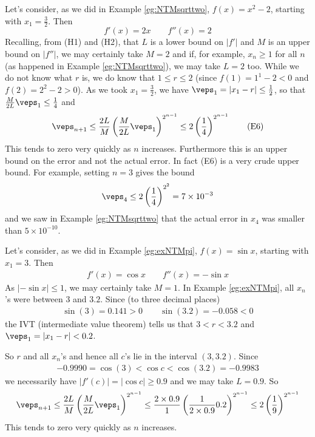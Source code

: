 \bigskip
\begin{eg}
\label{eg:NTMsqrttwoB} 
Let's consider, as we did in Example \ref{eg:NTMsqrttwo}, 
$f(x)=x^2-2$, starting with $x_1=\frac{3}{2}$. Then
\begin{equation*}
f'(x)=2x\qquad
f''(x)=2
\end{equation*}
Recalling, from (H1) and (H2), that $L$ is a lower bound on $|f'|$ and
$M$ is an upper bound on $|f''|$,
 we may certainly take $M=2$ and if, for example, $x_n\ge 1$ for all
$n$ (as happened in Example \ref{eg:NTMsqrttwo}), we may take $L=2$ too.
While we do not know what $r$ is, we do know that $1\le r\le 2$ 
(since $f(1)=1^1-2<0$ and $f(2)=2^2-2>0$). As we took $x_1=\frac{3}{2}$,
we have $\veps_1=|x_1-r|\le \frac{1}{2}$, so that 
$\frac{M}{2L}\veps_1\le\frac{1}{4}$ and
\begin{equation*}
\veps_{n+1}\le  \frac{2L}{M}\left(\frac{M}{2L}\veps_1\right)^{2^{n-1}}
\le 2\left(\frac{1}{4}\right)^{2^{n-1}}
\tag{E6}\end{equation*}
This tends to zero very quickly as $n$ increases. Furthermore this is an
upper bound on the error and not the actual error. In fact 
(E6) is a very crude upper bound. For example, setting $n=3$ gives the bound
\begin{equation*}
\veps_4\le 2\left(\frac{1}{4}\right)^{2^2} = 7\times 10^{-3}
\end{equation*}
and we saw in Example \ref{eg:NTMsqrttwo} that the actual error in $x_4$ 
was smaller than $5\times 10^{-10}$.

\end{eg}



\begin{eg}\label{eg:NTMpi}
Let's consider, as we did in Example \ref{eg:exNTMpi}, $f(x)=\sin x$, 
starting with $x_1=3$. Then
\begin{align*}
f'(x)=\cos x\qquad
f''(x)=-\sin x
\end{align*}
As $|-\sin x|\le 1$, we may certainly take $M=1$. 
In Example \ref{eg:exNTMpi}, all $x_n$'s were between $3$ and $3.2$. 
Since (to three decimal places)
\begin{align*}
\sin(3)=0.141>0\qquad
\sin(3.2)=-0.058<0
\end{align*}
the IVT (intermediate value theorem) tells us that $3<r<3.2$ and $\veps_1=|x_1-r|<0.2$. 

So $r$ and all $x_n$'s and hence all $c$'s
lie in the interval $(3,3.2)$.  Since
\begin{align*}
-0.9990=\cos(3)<\cos c < \cos(3.2) =- 0.9983
\end{align*}
we necessarily have $\big|f'(c)\big|=\big|\cos c\big|\ge 0.9$ and we may 
take $L=0.9$.  So
\begin{align*}
\veps_{n+1}\le  \frac{2L}{M}\left(\frac{M}{2L}\veps_1\right)^{2^{n-1}}
\le \frac{2\times0.9}{1}\left(\frac{1}{2\times0.9}0.2\right)^{2^{n-1}}
\le 2\left(\frac{1}{9}\right)^{2^{n-1}}
\end{align*}
This tends to zero very quickly as $n$ increases.
\end{eg}

